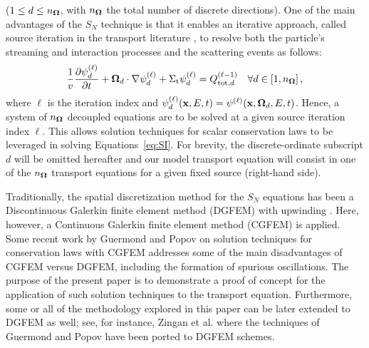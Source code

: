 ($1 \le d \le n_{\mathbf{\Omega}}$, with $n_{\mathbf{\Omega}}$ the total number of discrete directions). One of the
main advantages of the $S_N$ technique is that it enables an iterative approach, called source iteration
in the transport literature \cite{glasstone,lewis,duderstadt}, to resolve
both the particle's streaming and interaction processes and the scattering events as follows:
\begin{equation} \label{eq:SI}
  \frac{1}{v}\frac{\partial \psi_d^{(\ell)}}{\partial t}
    + \mathbf{\Omega}_{d}\cdot\nabla\psi_d^{(\ell)}
    + \Sigma_\textup{t}\psi_d^{(\ell)} = Q_{\textup{tot},d}^{(\ell-1)} \quad \forall d \in [1,n_{\mathbf{\Omega}}]\,, 
\end{equation}
where $\ell$ is the iteration index and $\psi_d^{(\ell)}(\mathbf{x},E,t) = \psi^{(\ell)}(\mathbf{x},\mathbf{\Omega}_d,E,t)$.
Hence, a system of $n_{\mathbf{\Omega}}$ decoupled equations are to be solved
at a given source iteration index $\ell$. This allows solution techniques for scalar conservation
laws to be leveraged in solving Equations~\eqref{eq:SI}. For brevity, the discrete-ordinate subscript $d$
will be omitted hereafter and our model transport equation will consist in one of the $n_{\mathbf{\Omega}}$ transport
equations for a given fixed source (right-hand side).

Traditionally, the spatial discretization method for the $S_N$
equations has been a Discontinuous Galerkin finite element method (DGFEM) with upwinding
\cite{Lesaint1974,Reed_Hill_1973}. Here, however,
a Continuous Galerkin finite element method (CGFEM) is applied.
Some recent work by Guermond and Popov \cite{guermond_ev} on
solution techniques for conservation laws with CGFEM addresses some
of the main disadvantages of CGFEM versus DGFEM, including the formation
of spurious oscillations. The purpose of the present paper is to demonstrate a proof of concept
for the application of such solution techniques to the transport equation.
Furthermore, some or all of the methodology explored in this paper can be
later extended to DGFEM as well; see, for instance, Zingan et al. \cite{zingan_2013}
where the techniques of Guermond and Popov \cite{guermond_ev} have been ported to DGFEM schemes.

